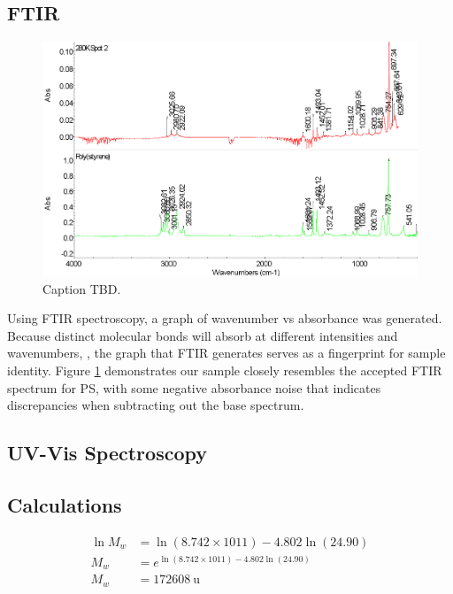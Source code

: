\documentclass[twocolumn]{article}
\begin{document}
            \subsection{FTIR}
                \begin{figure}[H]
                    \centering
                    \includegraphics[width=\columnwidth]{img/ftir-comp.png}
                    \caption{Caption TBD.}\label{fig:ftir-comp}
                \end{figure}
                Using FTIR spectroscopy, a graph of wavenumber vs absorbance  was generated. Because distinct  molecular bonds will absorb at different intensities and wavenumbers, , the graph that FTIR generates serves as a fingerprint for sample identity. Figure \ref{fig:ftir-comp} demonstrates our sample closely resembles the accepted FTIR spectrum for PS, with some negative absorbance noise that indicates discrepancies when subtracting out the base spectrum.
            \subsection{UV-Vis Spectroscopy}
            \subsection{Calculations}
                \begin{align}
                    \ln{M_w} &= \ln{(8.742 \times 1011)} - 4.802 \ln{(24.90)}\\
                    M_w &= e^{\ln{(8.742 \times 1011)} - 4.802 \ln{(24.90)}} \nonumber\\
                    M_w &= \qty{172608}{\atomicmassunit} \nonumber
                \end{align}
\end{document}
